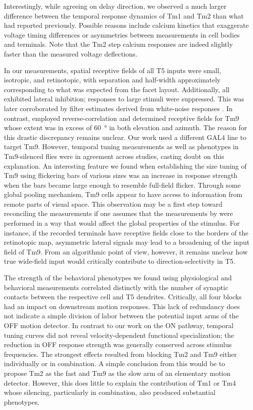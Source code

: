 Interestingly, while agreeing on delay direction, we observed a much larger difference between the temporal response dynamics of Tm1 and Tm2 than what \citet{Behnia:2014jh} had reported previously. Possible reasons include calcium kinetics that exaggerate voltage timing differences or asymmetries between measurements in cell bodies and terminals. Note that the Tm2 step calcium responses are indeed slightly faster than the measured voltage deflections.

In our measurements, spatial receptive fields of all T5 inputs were small, isotropic, and retinotopic, with separation and half-width approximately corresponding to what was expected from the facet layout. Additionally, all exhibited lateral inhibition; responses to large stimuli were suppressed. This was later corroborated by filter estimates derived from white-noise responses \citep{Arenz:2017aa}. In contrast, \citet{Fisher:2015aa} employed reverse-correlation and determined receptive fields for Tm9 whose extent was in excess of \SI{60}{\degree} in both elevation and azimuth. The reason for this drastic discrepancy remains unclear. Our work used a different GAL4 line to target Tm9. However, temporal tuning measurements as well as phenotypes in Tm9-silenced flies were in agreement across studies, casting doubt on this explanation. An interesting feature we found when establishing the size tuning of Tm9 using flickering bars of various sizes was an increase in response strength when the bars became large enough to resemble full-field flicker. Through some global pooling mechanism, Tm9 cells appear to have access to information from remote parts of visual space. This observation may be a first step toward reconciling the measurements if one assumes that the measurements by \citeauthor{Fisher:2015aa} were performed in a way that would affect the global properties of the stimulus. For instance, if the recorded terminals have receptive fields close to the borders of the retinotopic map, asymmetric lateral signals may lead to a broadening of the input field of Tm9. From an algorithmic point of view, however, it remains unclear how true wide-field input would critically contribute to direction-selectivity in T5.

The strength of the behavioral phenotypes we found using physiological and behavioral measurements correlated distinctly with the number of synaptic contacts between the respective cell and T5 dendrites. Critically, all four blocks had an impact on downstream motion responses. This lack of redundancy does not indicate a simple division of labor between the potential input arms of the OFF motion detector. In contrast to our work on the ON pathway, temporal tuning curves did not reveal velocity-dependent functional specialization; the reduction in OFF response strength was generally conserved across stimulus frequencies. The strongest effects resulted from blocking Tm2 and Tm9 either individually or in combination. A simple conclusion from this would be to propose Tm2 as the fast and Tm9 as the slow arm of an elementary motion detector. However, this does little to explain the contribution of Tm1 or Tm4 whose silencing, particularly in combination, also produced substantial phenotypes.


